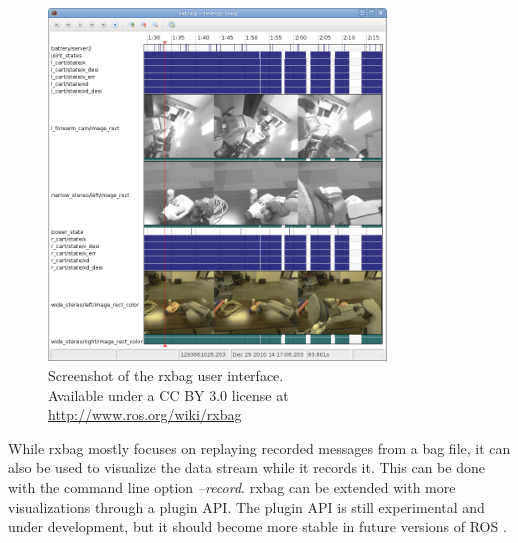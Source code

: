 \begin{figure}[htbp]
  \centering
  \includegraphics[width=0.8\textwidth]{img/rxbag_screenshot.png}
  \caption{Screenshot of the rxbag user interface.\\Available under a CC BY 3.0 license at \url{http://www.ros.org/wiki/rxbag}}
  \label{rxbag_screenshot}
\end{figure}

While rxbag mostly focuses on replaying recorded messages from a bag file, it can also be used to visualize the data stream while it records it. This can be done with the command line option \emph{--record}. rxbag can be extended with more visualizations through a plugin API. The plugin API is still experimental and under development, but it should become more stable in future versions of ROS \cite{rxbag}.




